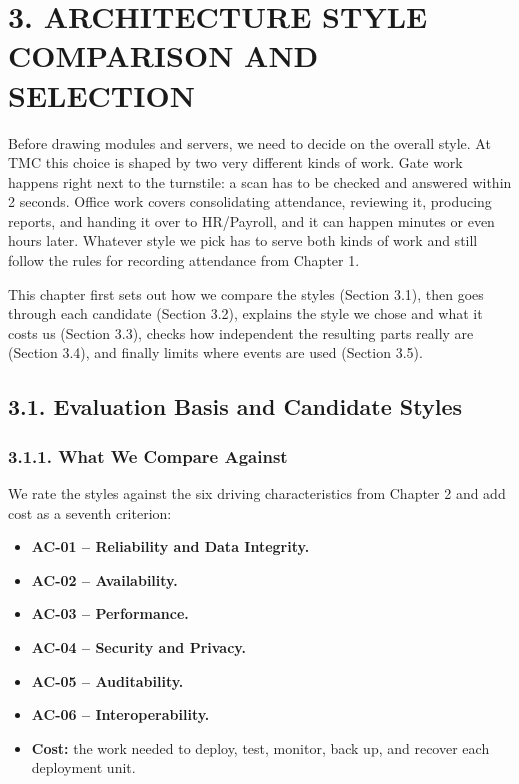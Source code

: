 \begingroup{}
\section*{3. ARCHITECTURE STYLE COMPARISON AND SELECTION}

{}


Before drawing modules and servers, we need to decide on the overall style. At TMC this choice is shaped by two very different kinds of work. Gate work happens right next to the turnstile: a scan has to be checked and answered within 2 seconds. Office work covers consolidating attendance, reviewing it, producing reports, and handing it over to HR/Payroll, and it can happen minutes or even hours later. Whatever style we pick has to serve both kinds of work and still follow the rules for recording attendance from Chapter 1.

This chapter first sets out how we compare the styles (Section 3.1), then goes through each candidate (Section 3.2), explains the style we chose and what it costs us (Section 3.3), checks how independent the resulting parts really are (Section 3.4), and finally limits where events are used (Section 3.5).

\subsection*{3.1. Evaluation Basis and Candidate Styles}

{}

\subsubsection*{3.1.1. What We Compare Against}

{}


We rate the styles against the six driving characteristics from Chapter 2 and add cost as a seventh criterion:

\begin{itemize}[leftmargin=36pt, itemsep=2pt, topsep=4pt, parsep=2pt]
  \item \textbf{AC-01 -- Reliability and Data Integrity.}
  \item \textbf{AC-02 -- Availability.}
  \item \textbf{AC-03 -- Performance.}
  \item \textbf{AC-04 -- Security and Privacy.}
  \item \textbf{AC-05 -- Auditability.}
  \item \textbf{AC-06 -- Interoperability.}
  \item \textbf{Cost:} the work needed to deploy, test, monitor, back up, and recover each deployment unit.
\end{itemize}

